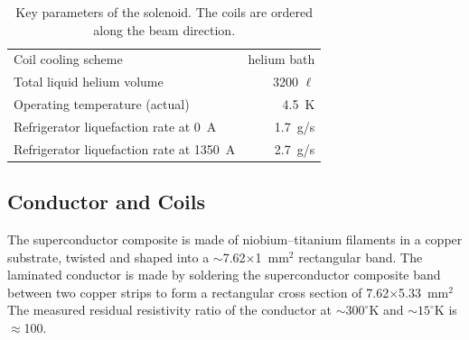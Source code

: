 \begin{table}[h]
\begin{center}
\begin{tabular}{lr}
       Coil cooling scheme             & helium bath \\   
       Total liquid helium volume      & 3200 $\ell$ \\
       Operating temperature (actual)  &  4.5~K \\   
       Refrigerator liquefaction rate at 0~A        & 1.7~g/s    \\
       Refrigerator liquefaction rate at 1350~A     & 2.7~g/s    \\
     \hline
   \end{tabular}
   \normalsize
 \end{center}
  \caption{
    Key parameters of the \gx{} solenoid. The
    coils are ordered along the beam direction.
    \label{tab:sol:summary}
  }
\end{table}


\subsection[Conductor and Coils]{Conductor and Coils
 \label{sec:sol:coils}
}

The superconductor composite is made of niobium--titanium filaments
in a copper substrate, twisted and shaped into a
$\sim$7.62$\times$1~mm$^2$ rectangular band. The laminated conductor
is made by soldering the superconductor composite band between two
copper strips
to form a rectangular cross section of 7.62$\times$5.33~mm$^2$
The measured residual resistivity ratio of the conductor at $\sim{}300^\circ{}$K and
$\sim{}15^\circ{}$K is $\approx{}$100.  

